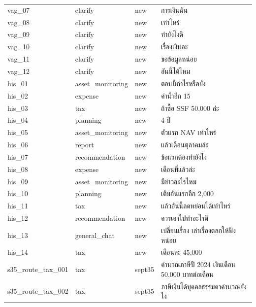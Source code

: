 \documentclass[11pt,a4paper]{article}
\begin{document}
{\begin{longtable}{lllp{9.5cm}}
vag\_\allowbreak{}07 & clarify & new & {\thaifont การเงินฉัน} \\
vag\_\allowbreak{}08 & clarify & new & {\thaifont เท่าไหร่} \\
vag\_\allowbreak{}09 & clarify & new & {\thaifont ทำยังไงดี} \\
vag\_\allowbreak{}10 & clarify & new & {\thaifont เรื่องเงินอะ} \\
vag\_\allowbreak{}11 & clarify & new & {\thaifont ขอข้อมูลหน่อย} \\
vag\_\allowbreak{}12 & clarify & new & {\thaifont อันนี้ได้ไหม} \\
his\_\allowbreak{}01 & asset\_\allowbreak{}monitoring & new & {\thaifont ตอนนี้กำไรหรือยัง} \\
his\_\allowbreak{}02 & expense & new & {\thaifont ค่าน้ำอีก }15 \\
his\_\allowbreak{}03 & tax & new & {\thaifont ถ้าซื้อ }SSF 50,000 {\thaifont ล่ะ} \\
his\_\allowbreak{}04 & planning & new & 4 {\thaifont ปี} \\
his\_\allowbreak{}05 & asset\_\allowbreak{}monitoring & new & {\thaifont ตัวแรก }NAV {\thaifont เท่าไหร่} \\
his\_\allowbreak{}06 & report & new & {\thaifont แล้วเดือนตุลาคมล่ะ} \\
his\_\allowbreak{}07 & recommendation & new & {\thaifont ข้อแรกต้องทำยังไง} \\
his\_\allowbreak{}08 & expense & new & {\thaifont เดือนที่แล้วล่ะ} \\
his\_\allowbreak{}09 & asset\_\allowbreak{}monitoring & new & {\thaifont มีข่าวอะไรไหม} \\
his\_\allowbreak{}10 & planning & new & {\thaifont เติมอันแรกอีก }2,000 \\
his\_\allowbreak{}11 & tax & new & {\thaifont แล้วอันนี้ลดหย่อนได้เท่าไหร่} \\
his\_\allowbreak{}12 & recommendation & new & {\thaifont ควรเอาไปทำอะไรดี} \\
his\_\allowbreak{}13 & general\_\allowbreak{}chat & new & {\thaifont เปลี่ยนเรื่อง เล่าเรื่องตลกให้ฟังหน่อย} \\
his\_\allowbreak{}14 & tax & new & {\thaifont เดือนละ }45,000 \\
s35\_\allowbreak{}route\_\allowbreak{}tax\_\allowbreak{}001 & tax & sept35 & {\thaifont คำนวณภาษีปี }2024 {\thaifont เงินเดือน }50,000 {\thaifont บาทต่อเดือน} \\
s35\_\allowbreak{}route\_\allowbreak{}tax\_\allowbreak{}002 & tax & sept35 & {\thaifont ภาษีเงินได้บุคคลธรรมดาคำนวณยังไง} \\

\end{longtable}}
\end{document}
